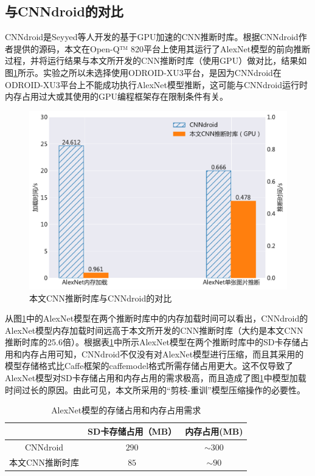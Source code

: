 \subsection{与CNNdroid的对比}

CNNdroid\cite{latifi2016cnndroid}是Seyyed等人开发的基于GPU加速的CNN推断时库。根据CNNdroid作者提供的源码，本文在Open-Q™ 820平台上使用其运行了AlexNet模型的前向推断过程，并将运行结果与本文所开发的CNN推断时库（使用GPU）做对比，结果如图\ref{figure:figuredroid}所示。实验之所以未选择使用ODROID-XU3平台，是因为CNNdroid在ODROID-XU3平台上不能成功执行AlexNet模型推断，这可能与CNNdroid运行时内存占用过大或其使用的GPU编程框架存在限制条件有关。

\begin{figure}[htbp]
    \centering
    \includegraphics[height=0.41\textwidth]{figures/cnndroid.pdf}
    \caption{本文CNN推断时库与CNNdroid的对比}\label{figure:figuredroid}
\end{figure}

从图\ref{figure:figuredroid}中的AlexNet模型在两个推断时库中的内存加载时间可以看出，CNNdroid的AlexNet模型内存加载时间远高于本文所开发的CNN推断时库（大约是本文CNN推断时库的25.6倍）。根据表\ref{table:tabledroid}中所示AlexNet模型在两个推断时库中的SD卡存储占用和内存占用可知，CNNdroid不仅没有对AlexNet模型进行压缩，而且其采用的模型存储格式比Caffe框架的caffemodel格式所需存储占用更大。这不仅导致了AlexNet模型对SD卡存储占用和内存占用的需求极高，而且造成了图\ref{figure:figuredroid}中模型加载时间过长的原因。由此可见，本文所采用的“剪枝-重训”模型压缩操作的必要性。


\begin{table}[htbp]
  \centering
  \caption{AlexNet模型的存储占用和内存占用需求}
  \label{table:tabledroid}
  \begin{tabular}{ccc}
    \toprule
       & SD卡存储占用（MB）& 内存占用(MB) \\
    \midrule
      CNNdroid & $290$ & $\sim 300$ \\
      本文CNN推断时库& $85$ & $\sim 90$ \\
    \bottomrule
  \end{tabular}
\end{table}


